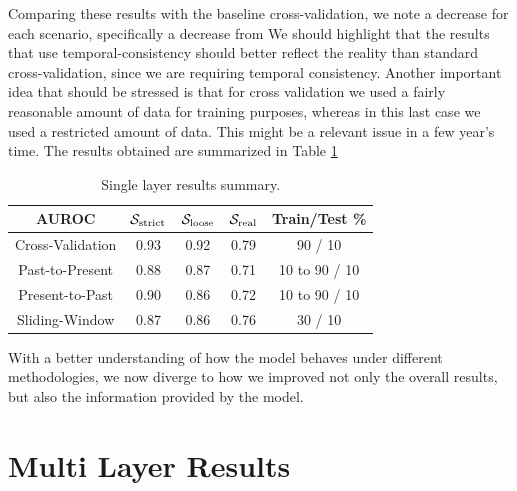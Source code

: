 Comparing these results with the baseline cross-validation, we note a decrease for each scenario, specifically a decrease from 
We should highlight that the results that use temporal-consistency should better reflect the reality than standard cross-validation, since we are requiring temporal consistency.
Another important idea that should be stressed is that for cross validation we used a fairly reasonable amount of data for training purposes, whereas in this last case we used a restricted amount of data. This might be a relevant issue in a few year's time. The results obtained are summarized in Table \ref{tab:singlelayer_results}

\begin{table}[!htb]
	\renewcommand{\arraystretch}{1.2} %
	\centering
	\begin{tabular}{ccccc}
	\hline AUROC & $\mathcal{S}_{\mathrm{strict}}$ & $\mathcal{S}_{\mathrm{loose}}$ & $\mathcal{S}_{\mathrm{real}}$ & Train/Test \%\\
	\hline Cross-Validation & 0.93 & 0.92 & 0.79 & 90 / 10\\
	\hline Past-to-Present & 0.88 & 0.87 & 0.71 & 10 to 90 / 10\\
	\hline Present-to-Past & 0.90 & 0.86 & 0.72 & 10 to 90 / 10\\
	\hline Sliding-Window & 0.87 & 0.86 & 0.76 & 30 / 10\\
	\hline
\end{tabular}
\caption{Single layer results summary.}
\label{tab:singlelayer_results}
\end{table}

\medskip

With a better understanding of how the model behaves under different methodologies, we now diverge to how we improved not only the overall results, but also the information provided by the model.

\section{Multi Layer Results}
\label{section:multi_layer_results}


